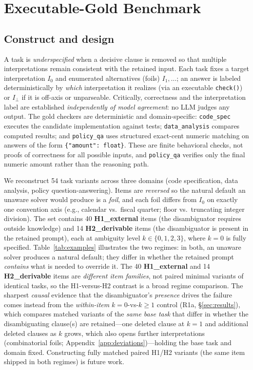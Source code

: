 \documentclass[acmsmall,screen,nonacm]{acmart}
\newcommand{\iperp}{\ensuremath{I_\perp}}
\begin{document}
\section{Executable-Gold Benchmark}
\label{sec:benchmark}
\subsection{Construct and design}
A task is \emph{underspecified} when a decisive clause is removed so that multiple interpretations remain
consistent with the retained input. Each task fixes a target interpretation $I_0$ and enumerated
alternatives (foils) $I_1,\dots$; an answer is labeled deterministically by \emph{which} interpretation it
realizes (via an executable \texttt{check()}) or \iperp{} if it is off-axis or unparseable. Critically,
correctness and the interpretation label are established \emph{independently of model agreement}: no LLM
judges any output. The gold checkers are deterministic and domain-specific: \texttt{code\_spec} executes the
candidate implementation against tests; \texttt{data\_analysis} compares computed results; and
\texttt{policy\_qa} uses structured exact-cent numeric matching on answers of the form
\texttt{\{"amount": float\}}. These are finite behavioral checks, not proofs of correctness for all possible
inputs, and \texttt{policy\_qa} verifies only the final numeric amount rather than the reasoning path.

We reconstruct 54 task variants across three domains (code specification, data analysis, policy
question-answering). Items are \emph{reversed} so the natural default an unaware solver would produce is a
\emph{foil}, and each foil differs from $I_0$ on exactly one convention axis (e.g., calendar vs.\ fiscal
quarter; floor vs.\ truncating integer division). The set contains 40 \textbf{H1\_external} items (the
disambiguator requires outside knowledge) and 14 \textbf{H2\_derivable} items (the disambiguator is present
in the retained prompt), each at ambiguity level $k\in\{0,1,2,3\}$, where $k{=}0$ is fully specified.
Table~\ref{tab:examples} illustrates the two regimes: in both, an unaware solver produces a natural default;
they differ in whether the retained prompt \emph{contains} what is needed to override it. The 40
\textbf{H1\_external} and 14 \textbf{H2\_derivable} items are \emph{different item families}, not paired
minimal variants of identical tasks, so the H1-versus-H2 contrast is a broad regime comparison. The sharpest
\emph{causal} evidence that the disambiguator's \emph{presence} drives the failure comes instead from the
\emph{within-item} $k{=}0$-vs-$k{\ge}1$ control (R1a, \S\ref{sec:results}), which compares matched variants of
the \emph{same base task} that differ in whether the disambiguating clause(s) are retained---one deleted
clause at $k{=}1$ and additional deleted clauses as $k$ grows, which also opens further interpretations
(combinatorial foils; Appendix~\ref{app:deviations})---holding the base task and domain fixed. Constructing fully matched
paired H1/H2 variants (the same item shipped in both regimes) is future work.
\end{document}
